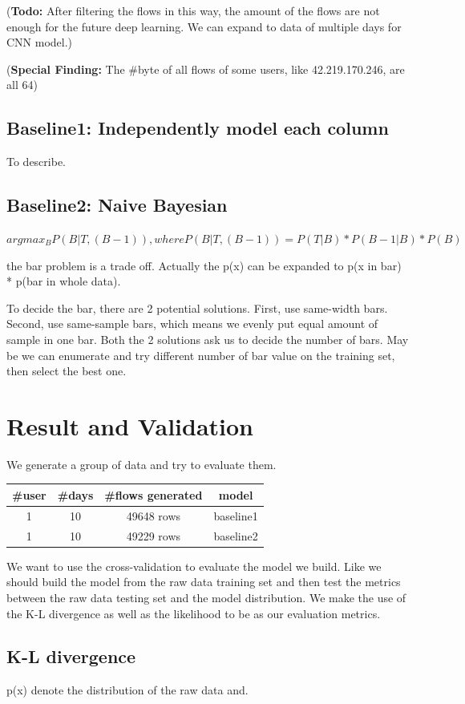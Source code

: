 \documentclass{article}
\begin{document}
(\textbf{Todo:} After filtering the flows in this way, the amount of the flows are not enough for the future deep learning. We can expand to data of multiple days for CNN model.)

(\textbf{Special Finding:} The \#byte of all flows of some users, like 42.219.170.246, are all 64)

\subsection{Baseline1: Independently model each column}
To describe.

\subsection{Baseline2: Naive Bayesian}

$argmax_{B}{P(B|T,(B-1))}, where P(B|T,(B-1)) = P(T|B) * P(B-1|B) * P(B)$

the bar problem is a trade off. Actually the p(x) can be expanded to p(x in bar) * p(bar in whole data).

To decide the bar, there are 2 potential solutions. First, use same-width bars. Second, use same-sample bars, which means we evenly put equal amount of sample in one bar. Both the 2 solutions ask us to decide the number of bars. May be we can enumerate and try different number of bar value on the training set, then select the best one.

\section{Result and Validation}
We generate a group of data and try to evaluate them.

\begin{tabular}{|c|c|c|c|}
 \hline
\#user & \#days & \#flows generated & model\\
 \hline
1 & 10 & 49648 rows & baseline1 \\
 \hline
1 & 10 & 49229 rows & baseline2 \\
 \hline
\end{tabular}

We want to use the cross-validation to evaluate the model we build. Like we should build the model from the raw data training set and then test the metrics between the raw data testing set and the model distribution. We make the use of the K-L divergence as well as the likelihood to be as our evaluation metrics.

\subsection{K-L divergence}
p(x) denote the distribution of the raw data and.
\end{document}
